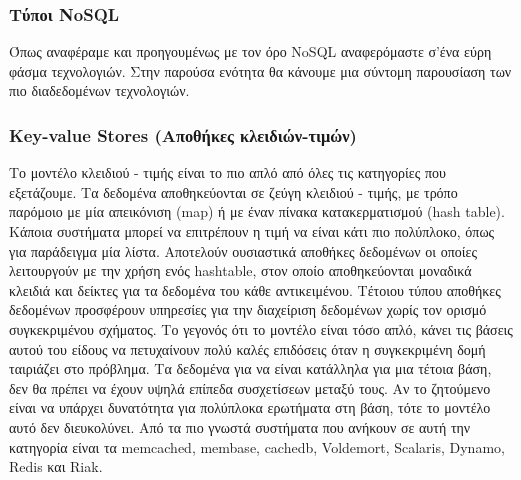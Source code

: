 		\subsubsection{Τύποι NoSQL}
		Όπως αναφέραμε και προηγουμένως με τον όρο NoSQL αναφερόμαστε σ'ένα εύρη φάσμα τεχνολογιών. Στην παρούσα ενότητα θα κάνουμε μια σύντομη παρουσίαση των πιο διαδεδομένων τεχνολογιών.
		
		\subsubsection{Key-value Stores (Αποθήκες κλειδιών-τιμών)}
		Το μοντέλο κλειδιού - τιμής είναι το πιο απλό από όλες τις κατηγορίες που εξετάζουμε. Τα δεδομένα αποθηκεύονται σε ζεύγη κλειδιού - τιμής, με τρόπο παρόμοιο με μία απεικόνιση (map) ή με έναν πίνακα κατακερματισμού (hash table). Κάποια συστήματα μπορεί να επιτρέπουν η τιμή να είναι κάτι πιο πολύπλοκο, όπως για παράδειγμα μία λίστα. Αποτελούν ουσιαστικά αποθήκες δεδομένων οι οποίες λειτουργούν με την χρήση ενός hashtable, στον οποίο αποθηκεύονται μοναδικά κλειδιά και δείκτες για τα δεδομένα του κάθε αντικειμένου. Τέτοιου τύπου αποθήκες δεδομένων προσφέρουν υπηρεσίες για την διαχείριση δεδομένων χωρίς τον ορισμό συγκεκριμένου σχήματος. Το γεγονός ότι το μοντέλο είναι τόσο απλό, κάνει τις βάσεις αυτού του είδους να πετυχαίνουν πολύ καλές επιδόσεις όταν η συγκεκριμένη δομή ταιριάζει στο πρόβλημα. Τα δεδομένα για να είναι κατάλληλα για μια τέτοια βάση, δεν θα πρέπει να έχουν υψηλά επίπεδα συσχετίσεων μεταξύ τους. Αν το ζητούμενο είναι να υπάρχει δυνατότητα για πολύπλοκα ερωτήματα στη βάση, τότε το μοντέλο αυτό δεν διευκολύνει. Από τα πιο γνωστά συστήματα που ανήκουν σε αυτή την κατηγορία είναι τα memcached, membase, cachedb, Voldemort, Scalaris, Dynamo, Redis και Riak\cite{DeCandia:2007:DAH:1323293.1294281}\cite{seeger2009key}.
		
